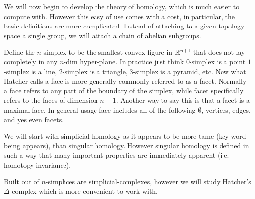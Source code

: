 \documentclass[11pt,leqno,oneside]{amsart}
\newenvironment{dateenv}{
  \vspace{1em}
}{
  \vspace{1em}
}
\newcommand{\mydate}[4]{
  \newdate{#1}{#2}{#3}{#4}
  \begin{dateenv}
    \hfill\displaydate{#1}
  \end{dateenv}
}
\numberwithin{thm}{section}
\begin{document}
We will now begin to develop the theory of homology, which is much
easier to compute with. However this easy of use comes with a cost, in
particular, the basic definitions are more complicated. Instead of
attaching to a given topology space a single group, we will attach a
chain of abelian subgroups.

Define the \(n\)-simplex to be the smallest convex figure in
\({\mathbb R}^{n+1}\) that does not lay completely in any \(n\)-dim
hyper-plane. In practice just think \(0\)-simplex is a point
\(1\)-simplex is a line, \(2\)-simplex is a triangle, \(3\)-simplex is
a pyramid, etc. Now what Hatcher calls a face is more generally
commonly referred to as a facet. Normally a face refers to any part of
the boundary of the simplex, while facet specifically refers to the
faces of dimension \(n-1\). Another way to say this is that a facet is
a maximal face. In general usage face includes all of the following
\(\emptyset\), vertices, edges, and yes even facets.

We will start with simplicial homology as it appears to be more tame
(key word being appears), than singular homology. However singular
homology is defined in such a way that many important properties are
immediately apparent (i.e. homotopy invariance).

Built out of \(n\)-simplices are simplicial-complexes, however we will
study Hatcher's \(\Delta\)-complex which is more convenient to work with.

\mydate{d14}{27}{2}{2017}
\end{document}

